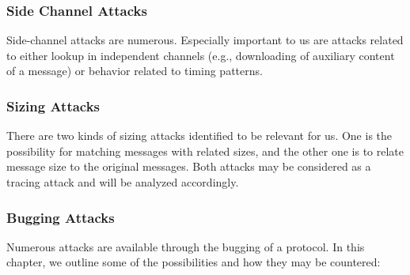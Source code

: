 \subsubsection{Side Channel Attacks}
Side-channel attacks are numerous. Especially important to us are attacks related to either lookup in independent channels (e.g., downloading of auxiliary content of a message) or behavior related to timing patterns.

\subsubsection{Sizing Attacks}
There are two kinds of sizing attacks identified to be relevant for us. One is the possibility for matching messages with related sizes, and the other one is to relate message size to the original messages. Both attacks may be considered as a tracing attack and will be analyzed accordingly.

\subsubsection{Bugging Attacks}
Numerous attacks are available through the bugging of a protocol. In this chapter, we outline some of the possibilities and how they may be countered:

